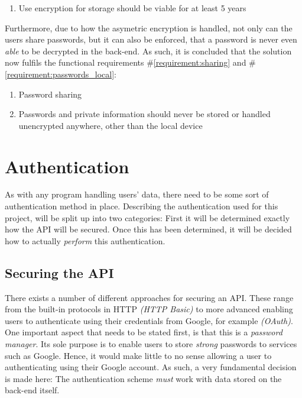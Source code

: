 			\vspace{-3ex}\begin{enumerate}
				\setlength\itemsep{0.1em}
				\setcounter{enumi}{4-1}
				\item Use encryption for storage should be viable for at least 5 years
			\end{enumerate}

			Furthermore, due to how the asymetric encryption is handled, not only can the users share passwords, but it can also be enforced, that a password is never even \emph{able} to be decrypted in the back-end. As such, it is concluded that the solution now fulfils the functional requirements \#\ref{requirement:sharing} and \#\ref{requirement:passwords_local}:
			\vspace{-3ex}\begin{enumerate}
				\setlength\itemsep{0.1em}
				\setcounter{enumi}{5-1}
				\item Password sharing
				\setcounter{enumi}{9-1}
				\item Passwords and private information should never be stored or handled unencrypted anywhere, other than the local device
			\end{enumerate}




	\section{Authentication}
		As with any program handling users' data, there need to be some sort of authentication method in place. Describing the authentication used for this project, will be split up into two categories: First it will be determined exactly how the API will be secured. Once this has been determined, it will be decided how to actually \emph{perform} this authentication.

		\subsection{Securing the API}
			There exists a number of different approaches for securing an API. These range from the built-in protocols in HTTP \emph{(HTTP Basic)} to more advanced enabling users to authenticate using their credentials from Google, for example \emph{(OAuth)}. One important aspect that needs to be stated first, is that this is a \emph{password manager}. Its sole purpose is to enable users to store \emph{strong} passwords to services such as Google. Hence, it would make little to no sense allowing a user to authenticating using their Google account. As such, a very fundamental decision is made here: The authentication scheme \emph{must} work with data stored on the back-end itself.

